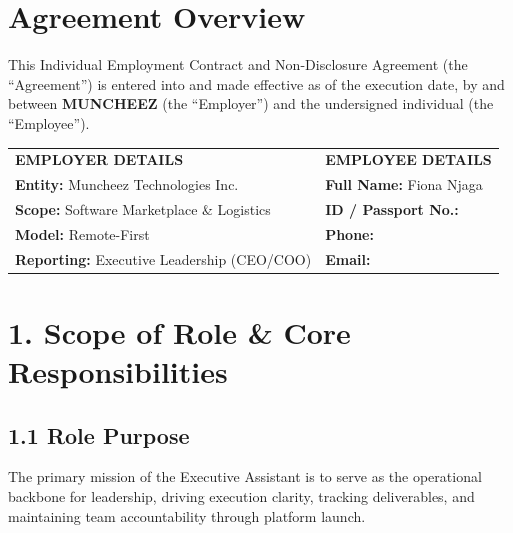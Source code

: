 \documentclass[11pt,a4paper]{article}
\begin{document}
\newpage


\section{Agreement Overview}

This Individual Employment Contract and Non-Disclosure Agreement (the ``Agreement'') is entered into and made effective as of the execution date, by and between \textbf{MUNCHEEZ} (the ``Employer'') and the undersigned individual (the ``Employee'').

\vspace{0.2cm}

\begin{tabularx}{\textwidth}{@{} X !{\color{LinkBlue}\vrule width 1.5pt} X @{}}
\textbf{\textsf{\small EMPLOYER DETAILS}} & \textbf{\textsf{\small EMPLOYEE DETAILS}} \\[0.1cm]
\textsf{\small \textbf{Entity:} Muncheez Technologies Inc.} & \textsf{\small \textbf{Full Name:} Fiona Njaga} \\
\textsf{\small \textbf{Scope:} Software Marketplace \& Logistics} & \textsf{\small \textbf{ID / Passport No.:} \underline{\hspace{3.5cm}}} \\
\textsf{\small \textbf{Model:} Remote-First} & \textsf{\small \textbf{Phone:} \underline{\hspace{3.5cm}}} \\
\textsf{\small \textbf{Reporting:} Executive Leadership (CEO/COO)} & \textsf{\small \textbf{Email:} \underline{\hspace{3.5cm}}} \\
\end{tabularx}

\vspace{0.3cm}

\section{1. Scope of Role \& Core Responsibilities}

\subsection{1.1 Role Purpose}
The primary mission of the Executive Assistant is to serve as the operational backbone for leadership, driving execution clarity, tracking deliverables, and maintaining team accountability through platform launch.
\end{document}
